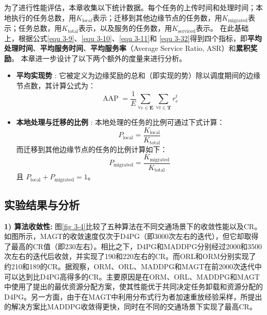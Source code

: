 为了进行性能评估，本章收集以下统计数据。每个任务的上传时间和处理时间；本地执行的任务总数，用$K_{\operatorname{local}}$表示；迁移到其他边缘节点的任务数，用$K_{\operatorname{migrated}}$表示；任务总数，用$K_{\operatorname{total}}$表示，以及服务的任务数，用$K_{\operatorname{serviced}}$表示。
在此基础上，根据公式\ref{equ 3-9}、\ref{equ 3-10}、\ref{equ 3-11}和 \ref{equ 3-32}得到四个指标，即\textbf{平均处理时间}、\textbf{平均服务时间}、\textbf{平均服务率}（Average Service Ratio, ASR）和\textbf{累积奖励}。
本章进一步设计了以下两个额外的度量来进行分析。
\begin{itemize}
	\item \textbf{平均实现势} : 它被定义为边缘奖励的总和（即实现的势）除以调度期间的边缘节点数，其计算公式为：
		\begin{equation}
		 	 \operatorname{AAP} = \frac{1}{E}\sum_{\forall e \in \mathbf{E}} \sum_{\forall t \in \mathbf{T}} r_{e}^{t}
		\end{equation}
	\item \textbf{本地处理与迁移的比例} : 本地处理的任务的比例可通过下式计算：
		\begin{equation}
			P_{\operatorname{local}} = \frac{K_{\operatorname{local}}}{K_{\operatorname{total}}}
		\end{equation}
		而迁移到其他边缘节点的任务的比例计算如下：
		\begin{equation}
			P_{\operatorname{migrated}} = \frac{K_{\operatorname{migrated}}}{K_{\operatorname{total}}}
		\end{equation}
		且 $P_{\operatorname{local}} +P_{\operatorname{migrated}} = 1$。
\end{itemize}

\subsection{实验结果与分析}

\textbf{1) 算法收敛性:} 图\ref{fig 3-4}比较了五种算法在不同交通场景下的收敛性能以及CR。如图所示，MAGT的收敛速度仅次于D4PG（即3000次左右的迭代），但它却取得了最高的CR值（即230左右）。相比之下，D4PG和MADDPG分别经过2000和3500次左右的迭代后收敛，并实现了190和220左右的CR。而ORL和ORM分别实现了约210和189的CR。据观察，ORM、ORL、MADDPG和MAGT在前2000次迭代中可以达到比D4PG高得多的CR。主要原因是在ORM、ORL、MADDPG和MAGT中使用了提出的最优资源分配方案，使其性能优于共同决定任务卸载和资源分配的D4PG。另一方面，由于在MAGT中利用分布式行为者加速重放经验采样，所提出的解决方案比MADDPG收敛得更快，同时在不同的交通场景下实现了最高CR。

